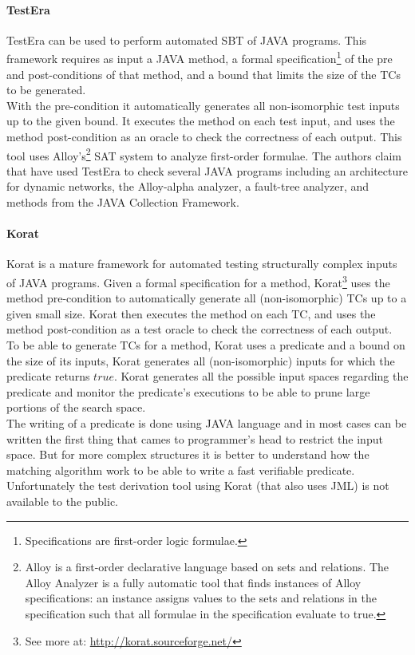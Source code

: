 \paragraph{TestEra}
TestEra\cite{testera} can be used to perform automated \ac{SBT} of
JAVA programs. This framework requires as input a JAVA method, a formal specification\footnote{Specifications are first-order logic formulae.}
of the pre and post-conditions of that method, and a bound that limits the size of the \ac{TC}s to be generated.\\
With the pre-condition it automatically generates all non-isomorphic test inputs up to the given bound.
It executes the method on each test input, and uses the method post-condition as an oracle to check the correctness of each output. This tool
uses Alloy's\footnote{Alloy is a first-order declarative language based on sets and relations. The Alloy Analyzer is a fully
automatic tool that finds instances of Alloy specifications: an instance
assigns values to the sets and relations in the specification such that
all formulae in the specification evaluate to true.} \ac{SAT} system to analyze first-order  formulae.
The authors claim that have used TestEra to check several JAVA programs including an architecture for
dynamic networks, the Alloy-alpha analyzer, a fault-tree analyzer, and methods from the JAVA Collection Framework.

\paragraph{Korat}
Korat\cite{Boyapati02korat:automated} is a mature framework for automated testing structurally complex inputs of JAVA programs.
Given a formal specification for a method, Korat\footnote{See more at: \url{http://korat.sourceforge.net/}} uses the method pre-condition
to automatically generate all (non-isomorphic) \ac{TC}s up to a given small size.
Korat then executes the method on each \ac{TC}, and uses the method post-condition as a test oracle to check the correctness of each output.\\
To be able to generate \ac{TC}s for a method, Korat uses a predicate and a bound on the size of its inputs,
Korat generates all (non-isomorphic) inputs for which the predicate returns $true$.
Korat generates all the possible input spaces regarding the predicate and monitor the predicate's executions to be able to prune large portions of the search space.\\
\indent The writing of a predicate is done using JAVA language and in most cases can be written the first thing that cames to programmer's head to restrict the input space.
But for more complex structures it is better to understand how the matching algorithm work to be able to write a fast verifiable predicate.\\
Unfortunately the test derivation tool using Korat (that also uses \ac{JML}) is not available to the public.

